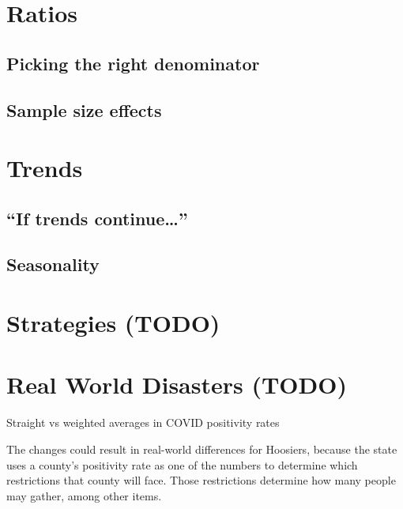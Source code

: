 \documentclass[
]{krantz}
\renewenvironment{quote}{\begin{VF}}{\end{VF}}
\begin{document}
\hypertarget{ratios}{%
\section{Ratios}\label{ratios}}

\hypertarget{picking-the-right-denominator}{%
\subsection{Picking the right denominator}\label{picking-the-right-denominator}}

\hypertarget{sample-size-effects}{%
\subsection{Sample size effects}\label{sample-size-effects}}

\hypertarget{trends}{%
\section{Trends}\label{trends}}

\hypertarget{if-trends-continue}{%
\subsection{\texorpdfstring{``If trends continue\ldots{}''}{``If trends continue\ldots''}}\label{if-trends-continue}}

\hypertarget{seasonality}{%
\subsection{Seasonality}\label{seasonality}}

\hypertarget{strategies-todo-1}{%
\section{Strategies (TODO)}\label{strategies-todo-1}}

\hypertarget{real-world-disasters-todo}{%
\section{Real World Disasters (TODO)}\label{real-world-disasters-todo}}

Straight vs weighted averages in COVID positivity rates \citep{indy_rates}

\begin{quote}
The changes could result in real-world differences for Hoosiers, because the state uses a county's positivity rate as one of the numbers to determine which restrictions that county will face. Those restrictions determine how many people may gather, among other items.
\end{quote}
\end{document}
